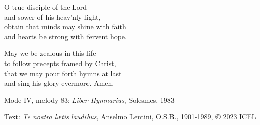 \hymn



\begin{underhymnverse}
O true disciple of the Lord\\
and sower of his heav’nly light,\\
obtain that minds may shine with faith\\
and hearts be strong with fervent hope.

May we be zealous in this life\\
to follow precepts framed by Christ,\\
that we may pour forth hymns at last\\
and sing his glory evermore. Amen.
\end{underhymnverse}

\begin{hymnsource}
Mode IV, melody 83; \emph{Liber Hymnarius}, Solesmes, 1983

Text: \emph{Te nostra lætis laudibus}, Anselmo Lentini, O.S.B., 1901-1989, © 2023 ICEL
\end{hymnsource}
